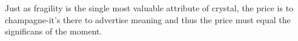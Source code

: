 
Just as fragility is the single most valuable attribute of crystal, the price is to champagne-it's there to advertise meaning and thus the price must equal the significans of the moment.